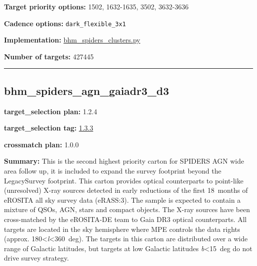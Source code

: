 \noindent\textbf{Target priority options:} 1502, 1632-1635, 3502, 3632-3636

\noindent\textbf{Cadence options:} \texttt{dark\_flexible\_3x1}

\noindent\textbf{Implementation:}
\href{https://github.com/sdss/target_selection/blob/1.3.3/python/target_selection/cartons/bhm_spiders_clusters.py}{bhm\_spiders\_clusters.py}

\noindent\textbf{Number of targets:} 427445

\begin{center}\rule{0.5\linewidth}{0.5pt}\end{center}

\hypertarget{bhm_spiders_agn_gaiadr3_d3_plan1.2.4}{%
\subsection{bhm\_spiders\_agn\_gaiadr3\_d3}\label{bhm_spiders_agn_gaiadr3_d3_plan1.2.4}}

\noindent\textbf{target\_selection plan:} 1.2.4

\noindent\textbf{target\_selection tag:}
\href{https://github.com/sdss/target_selection/tree/1.3.3/}{1.3.3}

\noindent\textbf{crossmatch plan:} 1.0.0

\noindent\textbf{Summary:} This is the second highest priority carton for SPIDERS
AGN wide area follow up, it is included to expand the survey footprint
beyond the LegacySurvey footprint. This carton provides optical
counterparts to point-like (unresolved) X-ray sources detected in early
reductions of the first 18~months of eROSITA all sky survey data
(eRASS:3). The sample is expected to contain a mixture of QSOs, AGN,
stars and compact objects. The X-ray sources have been cross-matched by
the eROSITA-DE team to Gaia DR3 optical counterparts. All targets are
located in the sky hemisphere where MPE controls the data rights
(approx. 180\textless{}\emph{l}\textless360~deg). The targets in this
carton are distributed over a wide range of Galactic latitudes, but
targets at low Galactic latitudes
\textbar{}\emph{b}\textbar\textless15~deg do not drive survey strategy.

